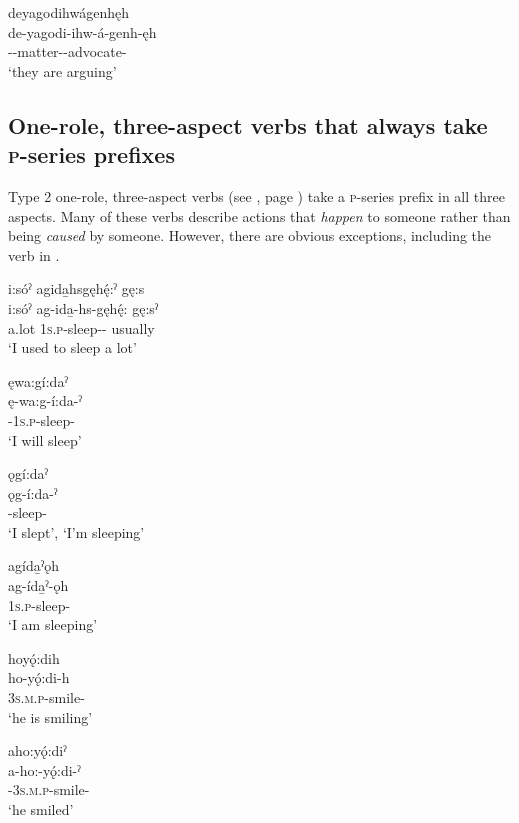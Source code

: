 \ex deyagodihwágenhęh\\\label{ex:3aspswitex2c}
\gll de-yagodi-ihw-á-genh-ęh\\
 {\dualic}--matter-{\joinerA}-advocate-{\stative}\\
\glt `they are arguing'
\z
\z


\subsection{One-role, three-aspect verbs that always take \textsc{p}-series prefixes} \label{One-role, three-aspect verbs that always take o prefixes}
Type 2 one-role, three-aspect verbs (see , page \pageref{figtab:1:ppthreeaspv}) take a \textsc{p}-series  prefix in all three aspects. Many of these verbs describe actions that \emph{happen} to someone rather than being \emph{caused} by someone. However, there are obvious exceptions, including the verb in .

\ea\label{ex:3aspswitex3}
\ea i:sóˀ agida̱hsgęhę́:ˀ gę:s  \\
\gll i:sóˀ ag-ida̱-hs-gęhę́:  gę:sˀ \\
a.lot \textsc{1s.p}-sleep-{\habitual}-{\past} usually\\
\glt ‘I used to sleep a lot’

\ex ęwa:gí:daˀ\\
\gll ę-wa:g-í:da-ˀ\\
 \fut-\textsc{1s.p}-sleep-{\punctual}\\
\glt `I will sleep'

\ex ǫgí:daˀ\\
\gll ǫg-í:da-ˀ\\
-sleep-{\punctual}\\
\glt ‘I slept’, ‘I’m sleeping’

\ex agída̱ˀǫh\\
\gll ag-ída̱ˀ-ǫh\\
 \textsc{1s.p}-sleep-{\stative}\\
\glt `I am sleeping'
\z
\z

\ea\label{ex:3aspswitex4}
\ea hoyǫ́:dih\\
\gll ho-yǫ́:di-h\\
 \textsc{3s.m.p}-smile-{\habitual}\\
\glt `he is smiling'

\ex aho:yǫ́:diˀ\\
\gll a-ho:-yǫ́:di-ˀ\\
 {\factual}-\textsc{3s.m.p}-smile-{\punctual}\\
\glt `he smiled'
\z
\z

